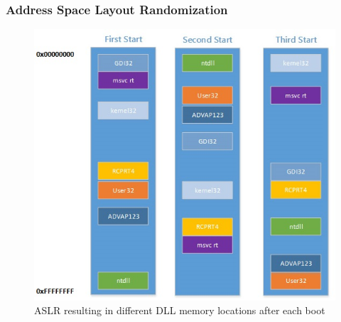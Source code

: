 \subsubsection{Address Space Layout Randomization}
\label{sec:aslr}
\begin{figure}[h]
\centering
\includegraphics[width=\textwidth,height=\textheight,keepaspectratio]{sections/background/defenses/aslr.jpg}
\caption{\gls{ASLR} resulting in different DLL memory locations after each boot}
\label{fig:aslr}
\end{figure}
